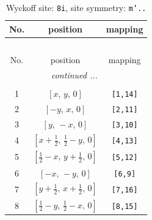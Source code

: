 \documentclass[fleqn,8pt]{jsarticle}
\begin{document}
\renewcommand{\arraystretch}{1.2}
\begin{longtable}{ccc}
\caption{Wyckoff site: {\tt 8i}, site symmetry: {\tt m'..}}
 \\
 \hline \hline
No. & position & mapping \\ \hline \endfirsthead

\multicolumn{2}{l}{\tablename\ \thetable{}} \\
 \hline \hline
No. & position & mapping \\ \hline \endhead

 \hline \hline
\multicolumn{2}{r}{\footnotesize\it continued ...} \\ \endfoot

 \hline \hline
\multicolumn{2}{r}{} \\ \endlastfoot

1 & $\left[ x,\, y,\, 0 \right]$ & {\tt [1,14]} \\ \hline
2 & $\left[ - y,\, x,\, 0 \right]$ & {\tt [2,11]} \\ \hline
3 & $\left[ y,\, - x,\, 0 \right]$ & {\tt [3,10]} \\ \hline
4 & $\left[ x + \frac{1}{2},\, \frac{1}{2} - y,\, 0 \right]$ & {\tt [4,13]} \\ \hline
5 & $\left[ \frac{1}{2} - x,\, y + \frac{1}{2},\, 0 \right]$ & {\tt [5,12]} \\ \hline
6 & $\left[ - x,\, - y,\, 0 \right]$ & {\tt [6,9]} \\ \hline
7 & $\left[ y + \frac{1}{2},\, x + \frac{1}{2},\, 0 \right]$ & {\tt [7,16]} \\ \hline
8 & $\left[ \frac{1}{2} - y,\, \frac{1}{2} - x,\, 0 \right]$ & {\tt [8,15]} \\
\end{longtable}
\renewcommand{\arraystretch}{1.2}
\end{document}
